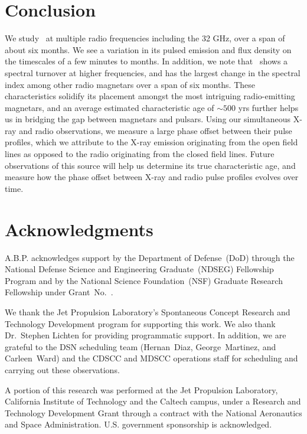 \documentclass[twocolumn]{emulateapj}
\begin{document}
\section{Conclusion}
\label{sec:conclusion}
We study \jmag\ at multiple radio frequencies including the 32 GHz, over a span of 
about six months. We see a variation in its pulsed emission and flux density on the 
timescales of a few minutes to months. In addition, we note that \jmag\ shows a spectral 
turnover at higher frequencies, and has the largest change in the spectral index among 
other radio magnetars over a span of six months. These characteristics solidify its 
placement amongst the most intriguing radio-emitting magnetars, and an average estimated 
characteristic age of $\sim 500$ yrs further helps us in bridging the gap between 
magnetars and pulsars. Using our simultaneous X-ray and radio observations, we measure 
a large phase offset between their pulse profiles, which we attribute to the X-ray 
emission originating from the open field lines as opposed to the radio originating 
from the closed field lines. Future observations of this source will help us determine 
its true characteristic age, and measure how the phase offset between X-ray and radio 
pulse profiles evolves over time. 
 
\section{Acknowledgments}
\label{sec:ack}
A.B.P. acknowledges support by the Department of Defense~(DoD) through the National 
Defense Science and Engineering Graduate~(NDSEG) Fellowship Program and by the National 
Science Foundation~(NSF) Graduate Research Fellowship under Grant~No.~.

We thank the Jet Propulsion Laboratory's Spontaneous Concept Research and Technology 
Development program for supporting this work. We also thank Dr.~Stephen Lichten for 
providing programmatic support. In addition, we are grateful to the DSN scheduling 
team (Hernan~Diaz, George~Martinez, and Carleen~Ward) and the CDSCC and MDSCC operations 
staff for scheduling and carrying out these observations.

A portion of this research was performed at the Jet Propulsion Laboratory, California 
Institute of Technology and the Caltech campus, under a Research and Technology 
Development Grant through a contract with the National Aeronautics and Space 
Administration. U.S. government sponsorship is acknowledged.


 
\end{document}
